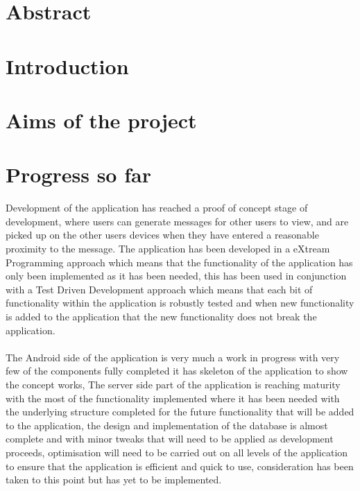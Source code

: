 \documentclass[a0,landscape]{a0poster}
\begin{document}
\begin{multicols}{4} %

\color{Navy}
\section{Abstract}

\color{Olive}
\section{Introduction}

\color{Black}
\section{Aims of the project}

\section{Progress so far}

Development of the application has reached a proof of concept stage of development, where users can generate messages for other users to view, and are picked up on the other users devices when they have entered a reasonable proximity to the message. The application has been developed in a eXtream Programming approach which means that the functionality of the application has only been implemented as it has been needed, this has been used in conjunction with a Test Driven Development approach which means that each bit of functionality within the application is robustly tested and when new functionality is added to the application that the new functionality does not break the application.\\
\\
The Android side of the application is very much a work in progress with very few of the components fully completed it has skeleton of the application to show the concept works, The server side part of the application is reaching maturity with the most of the functionality implemented where it has been needed with the underlying structure completed for the future functionality that will be added to the application, the design and implementation of the database is almost complete and with minor tweaks that will need to be applied as development proceeds, optimisation will need to be carried out on all levels of the application to ensure that the application is efficient and quick to use, consideration has been taken to this point but has yet to be implemented.


\end{multicols}
\end{document}

